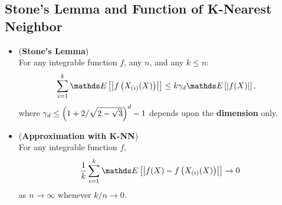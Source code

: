 \documentclass[11pt]{article}
\begin{document}
\subsection{Stone's Lemma and Function of K-Nearest Neighbor}
\begin{itemize}
\item 
\begin{lemma} (\textbf{Stone's Lemma})  \citep{devroye2013probabilistic}\\
For any integrable function $f$, any $n$, and any $k \le n$:
\begin{align}
\sum_{i=1}^{k}\E{}{\abs{f\paren{X_{(i)}(X)}}} &\le k \gamma_d \E{}{\abs{f(X)}}, \label{eqn: stone_lemma}
\end{align}
where $\gamma_d \le \left(1+ 2/\sqrt{2 - \sqrt{3}}\right)^d - 1$ depends upon the \textbf{dimension} only.
\end{lemma}

\item \begin{lemma} (\textbf{Approximation with K-NN})  \citep{devroye2013probabilistic}\\
For any integrable function $f$,
\begin{align*}
\frac{1}{k}\sum_{i=1}^{k}\E{}{\abs{f(X) - f\paren{X_{(i)}(X)}}} \to 0
\end{align*} as $n \rightarrow \infty$ whenever $k/n \rightarrow 0$.
\end{lemma}
\end{itemize}

\end{document}

